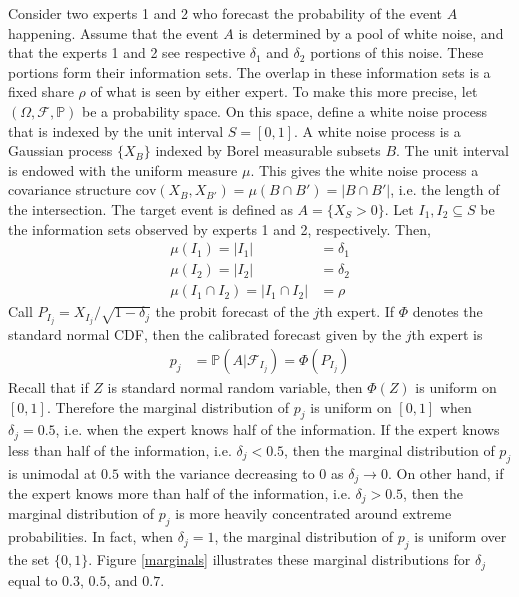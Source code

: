 \documentclass[11pt,twoside]{article}
\renewcommand{\P}{\mathbb{P}}
\begin{document}
Consider two experts 1 and 2 who forecast the probability of the event $A$ happening. Assume that the event $A$ is determined by a pool of white noise, and that the experts 1 and 2 see respective $\delta_1$ and $\delta_2$ portions of this noise. These portions form their information sets. The overlap in these information sets is a fixed share $\rho$ of what is seen by either expert. To make this more precise, let $(\Omega, \mathcal{F}, \P)$ be a probability space. On this space, define a white noise process that is indexed by the unit interval $S = [0,1]$. A white noise process is a Gaussian process $\{ X_B \}$ indexed by Borel measurable subsets $B$. The unit interval is endowed with the uniform measure $\mu$. This gives the white noise process a covariance structure $\text{cov}(X_B, X_{B'}) = \mu(B \cap B') = |B \cap B'|$, i.e. the length of the intersection. The target event is defined as $A = \{ X_{S} > 0\}$. Let $I_1, I_2 \subseteq S$ be the information sets observed by experts 1 and 2, respectively. Then,
\begin{align*}
\mu(I_1) = |I_1| &= \delta_1\\
\mu(I_2) = |I_2| &= \delta_2\\
\mu(I_1 \cap I_2) =  |I_1 \cap I_2| &= \rho
\end{align*}
Call $P_{I_j} = X_{I_j}/\sqrt{1-\delta_j}$ the probit forecast of the $j$th expert.  If $\Phi$ denotes the standard normal CDF, then the calibrated forecast given by the $j$th expert is
\begin{align*}
p_j &= \P\left(A | \mathcal{F}_{I_j}\right) = \Phi\left( P_{I_j}\right)
\end{align*}
Recall that if $Z$ is standard normal random variable, then $\Phi(Z)$ is uniform on $[0,1]$. Therefore the marginal distribution of $p_j$ is uniform on $[0,1]$ when $\delta_j = 0.5$, i.e. when the expert knows half of the information. If the expert knows less than half of the information, i.e. $\delta_j < 0.5$, then the marginal distribution of $p_j$ is unimodal at $0.5$ with the variance decreasing to 0 as $\delta_j \to 0$. On other hand, if the expert knows more than half of the information, i.e. $\delta_j > 0.5$, then the marginal  distribution of $p_j$ is more heavily concentrated around extreme probabilities. In fact, when $\delta_j = 1$, the marginal distribution of $p_j$ is uniform over the set $\{0,1\}$. Figure \ref{marginals} illustrates these marginal distributions for $\delta_j$ equal to $0.3$, $0.5$, and $0.7$. 
\end{document}

